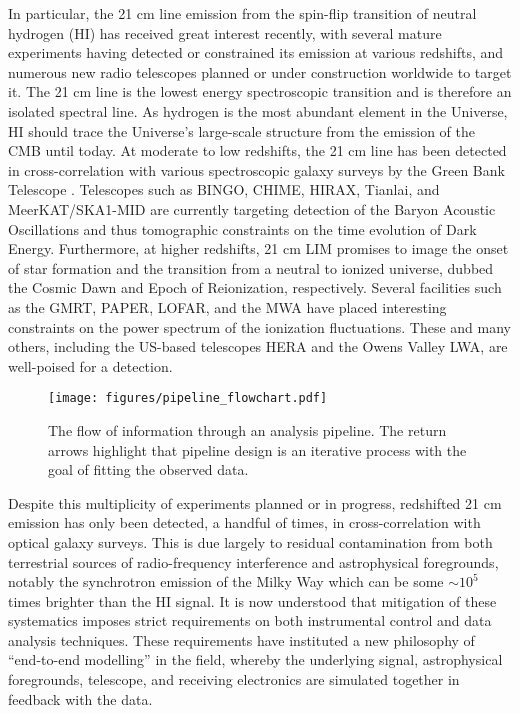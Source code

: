 In particular, the 21 cm line emission from the spin-flip transition of neutral hydrogen (HI) has received great interest recently, with several mature experiments having detected or constrained its emission at various redshifts, and numerous new radio telescopes planned or under construction worldwide to target it. The 21 cm line is the lowest energy spectroscopic transition and is therefore an isolated spectral line. As hydrogen is the most abundant element in the Universe, HI should trace the Universe's large-scale structure from the emission of the CMB until today. At moderate to low redshifts, the 21 cm line has been detected in cross-correlation with various spectroscopic galaxy surveys by the Green Bank Telescope \citep{changetal, masuietalgbt, switzeretalgbt, andersonetalparkes}. Telescopes such as BINGO, CHIME, HIRAX, Tianlai, and MeerKAT/SKA1-MID are currently targeting detection of the Baryon Acoustic Oscillations and thus tomographic constraints on the time evolution of Dark Energy. Furthermore, at higher redshifts, 21 cm LIM promises to image the onset of star formation and the transition from a neutral to ionized universe, dubbed the Cosmic Dawn and Epoch of Reionization, respectively. Several facilities such as the GMRT, PAPER, LOFAR, and the MWA \cite{lofar_eor, mwa_xray, mwa_firstseason} have placed interesting constraints on the power spectrum of the ionization fluctuations. These and many others, including the US-based telescopes HERA \citep{hera} and the Owens Valley LWA, are well-poised for a detection.

\begin{figure} %
\begin{center}
\texttt{[image: figures/pipeline\_flowchart.pdf]}%
\caption{The flow of information through an analysis pipeline. The return arrows highlight that pipeline design is an iterative process with the goal of fitting the observed data. \label{pipeline_flow}}
\end{center}
\end{figure}

Despite this multiplicity of experiments planned or in progress, redshifted 21 cm emission has only been detected, a handful of times, in cross-correlation with optical galaxy surveys. This is due largely to residual contamination from both terrestrial sources of radio-frequency interference and astrophysical foregrounds, notably the synchrotron emission of the Milky Way which can be some $\sim 10^5$ times brighter than the HI signal. It is now understood that mitigation of these systematics imposes strict requirements on both instrumental control and data analysis techniques. These requirements have instituted a new philosophy of ``end-to-end modelling'' in the field, whereby the underlying signal, astrophysical foregrounds, telescope, and receiving electronics are simulated together in feedback with the data.


